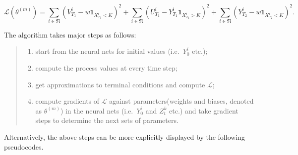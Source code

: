 \documentclass[
]{article}
\providecommand{\tightlist}{%
  \setlength{\itemsep}{0pt}\setlength{\parskip}{0pt}}
\begin{document}
\[
\mathcal{L}(\theta^{(m)})= \sum_{i\in\mathfrak{N}}(V_{T_1}^i-w\mathbf{1}_{X_{T_1}^i<K})^2 + \sum_{i\in\mathfrak{N}}(U_{T_1}^i-Y_{T_1}^i\mathbf{1}_{X_{T_1}^i>K})^2 + \sum_{i\in\mathfrak{N}}(Y_{T_2}^i-w\mathbf{1}_{X_{T_2}^i<K})^2.
\]

The algorithm takes major steps as follows:

\begin{quote}
\begin{enumerate}
\def\labelenumi{\roman{enumi})}
\tightlist
\item
  start from the neural nets for initial values (i.e.~\(Y_0^i\) etc.);
\item
  compute the process values at every time step;
\item
  get approximations to terminal conditions and compute \(\mathcal{L}\);
\item
  compute gradients of \(\mathcal{L}\) against parameters(weights and
  biases, denoted as \(\theta^{(m)}\)) in the neural nets
  (i.e.~\(Y_0^i\) and \(Z_t^k\) etc.) and take gradient steps to
  determine the next sets of parameters.
\end{enumerate}
\end{quote}

Alternatively, the above steps can be more explicitly displayed by the
following pseudocodes.
\end{document}
